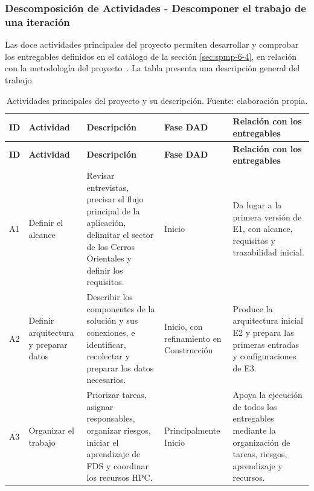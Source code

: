 \subsubsection{Descomposición de Actividades - Descomponer el trabajo de una iteración}\label{sec:spmp-9-3-1}
Las doce actividades principales del proyecto permiten desarrollar y comprobar los entregables definidos en el catálogo de la sección \ref{sec:spmp-6-4}, en relación con la metodología del proyecto~\cite{vfp2026,adaptacion2026}. La tabla presenta una descripción general del trabajo.
\begingroup
\setlength{\tabcolsep}{3pt}
\renewcommand{\arraystretch}{1.0}\begin{longtable}{|>{\raggedright\arraybackslash}p{0.045\dimexpr\linewidth-10\tabcolsep-6\arrayrulewidth\relax}|>{\raggedright\arraybackslash}p{0.15\dimexpr\linewidth-10\tabcolsep-6\arrayrulewidth\relax}|>{\raggedright\arraybackslash}p{0.30\dimexpr\linewidth-10\tabcolsep-6\arrayrulewidth\relax}|>{\raggedright\arraybackslash}p{0.21\dimexpr\linewidth-10\tabcolsep-6\arrayrulewidth\relax}|>{\raggedright\arraybackslash}p{0.295\dimexpr\linewidth-10\tabcolsep-6\arrayrulewidth\relax}|}
\caption{Actividades principales del proyecto y su descripción. Fuente: elaboración propia.}\label{tab:actividades-principales}\\\hline
\textbf{ID} & \textbf{Actividad} & \textbf{Descripción} & \textbf{Fase DAD} & \textbf{Relación con los entregables}\\\hline
\endfirsthead\hline
\textbf{ID} & \textbf{Actividad} & \textbf{Descripción} & \textbf{Fase DAD} & \textbf{Relación con los entregables}\\\hline
\endhead
A1 & Definir el alcance & Revisar entrevistas, precisar el flujo principal de la aplicación, delimitar el sector de los Cerros Orientales y definir los requisitos. & Inicio & Da lugar a la primera versión de E1, con alcance, requisitos y trazabilidad inicial.\\\hline
A2 & Definir arquitectura y preparar datos & Describir los componentes de la solución y sus conexiones, e identificar, recolectar y preparar los datos necesarios. & Inicio, con refinamiento en Construcción & Produce la arquitectura inicial E2 y prepara las primeras entradas y configuraciones de E3.\\\hline
A3 & Organizar el trabajo & Priorizar tareas, asignar responsables, organizar riesgos, iniciar el aprendizaje de FDS y coordinar los recursos HPC. & Principalmente Inicio & Apoya la ejecución de todos los entregables mediante la organización de tareas, riesgos, aprendizaje y recursos.\\\hline

\end{longtable}
